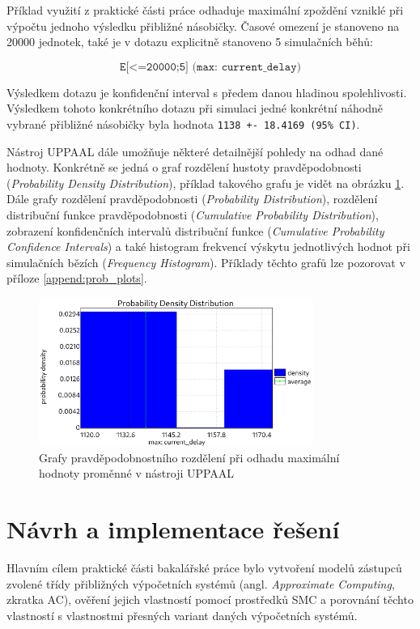 Příklad využití z praktické části práce odhaduje maximální zpoždění vzniklé při výpočtu jednoho výsledku přibližné násobičky. Časové omezení je stanoveno na 20000 jednotek, také je v dotazu explicitně stanoveno 5 simulačních běhů:

\begin{equation*}
    \texttt{E[<=20000;5] (max: current\_delay)}
\end{equation*}

Výsledkem dotazu je konfidenční interval s předem danou hladinou spolehlivosti. Výsledkem tohoto konkrétního dotazu při simulaci jedné konkrétní náhodně vybrané přibližné násobičky byla hodnota \texttt{1138 +- 18.4169 (95\% CI)}. 

Nástroj UPPAAL dále umožňuje některé detailnější pohledy na odhad dané hodnoty. Konkrétně se jedná o graf rozdělení hustoty pravděpodobnosti (\textit{Probability Density Distribution}), příklad takového grafu je vidět na obrázku \ref{fig:plot_prob_dens_dist}. Dále grafy rozdělení pravděpodobnosti (\textit{Probability Distribution}), rozdělení distribuční funkce pravděpodobnosti (\textit{Cumulative Probability Distribution}), zobrazení konfidenčních intervalů distribuční funkce (\textit{Cumulative Probability Confidence Intervals}) a také histogram frekvencí výskytu jednotlivých hodnot při simulačních bězích (\textit{Frequency Histogram}). Příklady těchto grafů lze pozorovat v příloze \ref{append:prob_plots}.

\begin{figure}[H]
    \centering
    \includegraphics[width=0.8\textwidth]{obrazky-figures/plot_prob_dens_dist.png}
    \caption{Grafy pravděpodobnostního rozdělení při odhadu maximální hodnoty proměnné v nástroji UPPAAL}
    \label{fig:plot_prob_dens_dist}
\end{figure}

\chapter{Návrh a implementace řešení}
\label{rozbor}
Hlavním cílem praktické části bakalářské práce bylo vytvoření modelů zástupců zvolené třídy přibližných výpočetních systémů (angl. \textit{Approximate Computing}, zkratka AC), ověření jejich vlastností pomocí prostředků SMC a porovnání těchto vlastností s vlastnostmi přesných variant daných výpočetních systémů.

